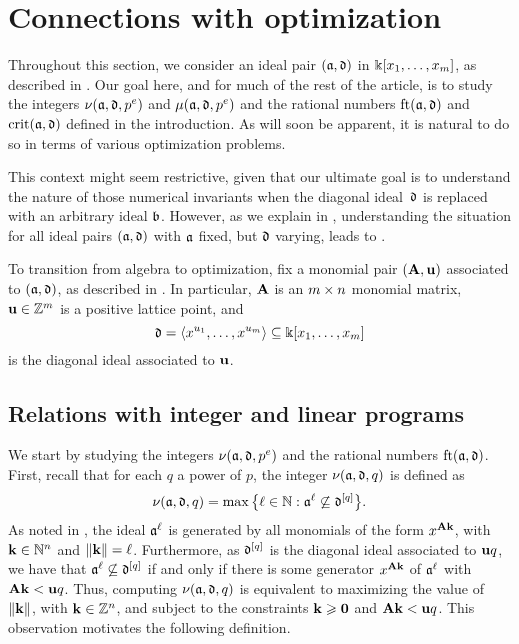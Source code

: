 \documentclass{amsart}
\begin{document}
\section{Connections with optimization}
\label{sec: LPs}

Throughout this section, we consider an ideal pair $(\mathfrak{a}, \mathfrak{d})$ in $\Bbbk[x_1, \ldots, x_{m}]$, as described in .
Our goal here, and for much of the rest of the article, is to study the integers $\nu(\mathfrak{a}, \mathfrak{d}, p^e)$ and $\mu(\mathfrak{a}, \mathfrak{d}, p^e)$ and the rational numbers $\operatorname{ft}(\mathfrak{a}, \mathfrak{d})$ and $\operatorname{crit}(\mathfrak{a}, \mathfrak{d})$ defined in the introduction.
As will soon be apparent, it is natural to do so in terms of various optimization problems.

\begin{remark} \label{reduction to diagonal :R}
   This context might seem restrictive, given that our ultimate goal is to understand the nature of those numerical invariants when the diagonal ideal~$\mathfrak{d}$ is replaced with an arbitrary ideal $\mathfrak{b}$.
   However, as we explain in , understanding the situation for all ideal pairs $(\mathfrak{a}, \mathfrak{d})$ with $\mathfrak{a}$ fixed, but $\mathfrak{d}$ varying, leads to .
\end{remark}

To transition from algebra to optimization, fix a monomial pair $(\mathbf{A}, \mathbf{u})$ associated to $(\mathfrak{a}, \mathfrak{d})$, as described in .  In particular, $\mathbf{A}$ is an $m \times n$ monomial matrix, $\mathbf{u} \in \mathbb{Z}^m$ is a positive lattice point, and
\[ \mathfrak{d} = \langle x^{u_1}, \ldots, x^{u_{m}} \rangle \subseteq \Bbbk[x_1, \ldots, x_{m}] \] is the diagonal ideal associated to $\mathbf{u}$.

\subsection{Relations with integer and linear programs}
We start by studying the integers $\nu(\mathfrak{a}, \mathfrak{d}, p^e)$ and the rational numbers $\operatorname{ft}(\mathfrak{a}, \mathfrak{d})$.
First, recall that for each $q$ a power of $p$, the integer $\nu(\mathfrak{a}, \mathfrak{d}, q)$ is defined as
\[\nu(\mathfrak{a},\mathfrak{d},q) = \max\big\{\ell \in \mathbb{N} : \mathfrak{a}^{\ell} \not\subseteq \mathfrak{d}^{[q]}\big\}.\]
As noted in ,  the ideal $\mathfrak{a}^{\ell}$ is generated by all monomials of the form $x^{\mathbf{A}\mathbf{k}}$, with $\mathbf{k}\in \mathbb{N}^n$ and $\| \mathbf{k} \| = \ell$.  Furthermore, as $\mathfrak{d}^{[q]}$ is the diagonal ideal associated to $\mathbf{u}q$, we have that $\mathfrak{a}^{\ell} \not\subseteq \mathfrak{d}^{[q]}$ if and only if there is some generator $x^{\mathbf{A} \mathbf{k}}$ of $\mathfrak{a}^{\ell}$ with $\mathbf{A}\mathbf{k} < \mathbf{u}q$.  Thus, computing $\nu(\mathfrak{a},\mathfrak{d},q)$ is equivalent to maximizing the value of $\| \mathbf{k} \|$, with $\mathbf{k} \in \mathbb{Z}^n$, and subject to the constraints $\mathbf{k} \geqslant \mathbf{0}$ and $\mathbf{A}\mathbf{k} < \mathbf{u}q$.
This observation motivates the following definition.
\end{document}
